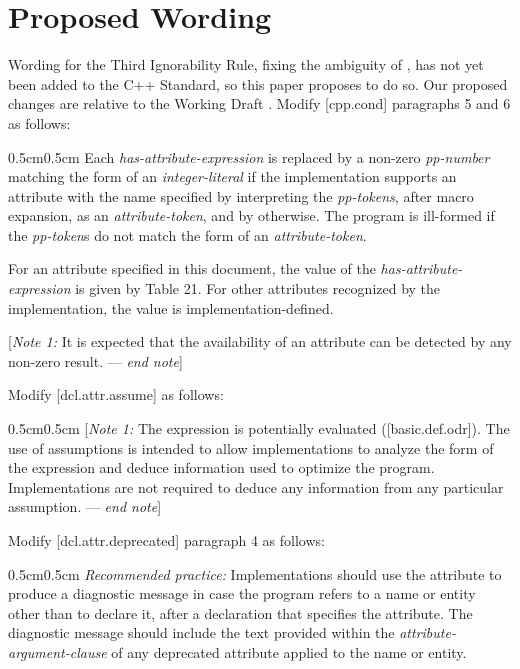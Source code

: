 \section{Proposed Wording}
\label{sec:wording}

Wording for the Third Ignorability Rule, fixing the ambiguity of , has not yet been added to the C++ Standard, so this paper proposes to do so. Our proposed changes are relative to the Working Draft \cite{N4944}. Modify [cpp.cond] paragraphs 5 and 6 as follows:

\begin{adjustwidth}{0.5cm}{0.5cm}
Each \emph{has-attribute-expression} is replaced by a non-zero \emph{pp-number} matching the form of an \emph{integer-literal} if the implementation supports an attribute with the name specified by interpreting the \emph{pp-tokens}, after macro expansion, as an \emph{attribute-token}, and by  otherwise. The program is ill-formed if the \emph{pp-token}s do not match the form of an \emph{attribute-token}.

For an attribute specified in this document, the value of the \emph{has-attribute-expression} is given by Table 21. For other attributes recognized by the implementation, the value is implementation-defined.

[\emph{Note 1:} It is expected that the availability of an attribute can be detected by any non-zero result. --- \emph{end note}] 
\end{adjustwidth}

Modify [dcl.attr.assume] as follows:

\begin{adjustwidth}{0.5cm}{0.5cm}
[\emph{Note 1:} The expression is potentially evaluated ([basic.def.odr]). The use of assumptions is intended to allow implementations to analyze the form of the expression and deduce information used to optimize the program. Implementations are not required to deduce any information from any particular assumption.  --- \emph{end note}]
\end{adjustwidth}

Modify [dcl.attr.deprecated] paragraph 4 as follows:

\begin{adjustwidth}{0.5cm}{0.5cm}
\emph{Recommended practice:} Implementations should use the  attribute to produce a diagnostic message in case the program refers to a name or entity other than to declare it, after a declaration that specifies the attribute. The diagnostic message should include the text provided within the \emph{attribute-argument-clause} of any deprecated attribute applied to the name or entity. 
\end{adjustwidth}

